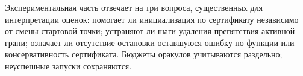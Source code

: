 Экспериментальная часть отвечает на три вопроса, существенных для
интерпретации оценок: помогает ли инициализация по сертификату независимо
от смены стартовой точки; устраняют ли шаги удаления препятствия
активной грани; означает ли отсутствие остановки оставшуюся ошибку по
функции или консервативность сертификата. Бюджеты оракулов учитываются
раздельно; неуспешные запуски сохраняются.
